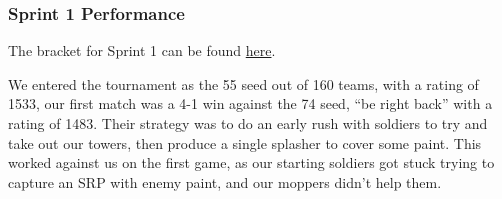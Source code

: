   \subsubsection{Sprint 1 Performance}

  The bracket for Sprint 1 can be found \href{https://challonge.com/bc25javasprint1}{here}.

  \medskip

  We entered the tournament as the 55 seed out of 160 teams, with a rating of 1533, our first match was a 4-1 win against the 74 seed, ``be right back'' with a rating of 1483. Their strategy was to do an early rush with soldiers to try and take out our towers, then produce a single splasher to cover some paint. This worked against us on the first game, as our starting soldiers got stuck trying to capture an SRP with enemy paint, and our moppers didn't help them.

  \medskip

